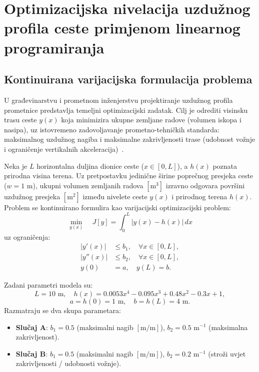 \section{Optimizacijska nivelacija uzdužnog profila ceste primjenom linearnog programiranja}

\subsection{Kontinuirana varijacijska formulacija problema}

U građevinarstvu i prometnom inženjerstvu projektiranje uzdužnog profila prometnice predstavlja temeljni optimizacijski zadatak. Cilj je odrediti visinsku trasu ceste $y(x)$ koja minimizira ukupne zemljane radove (volumen iskopa i nasipa), uz istovremeno zadovoljavanje prometno-tehničkih standarda: maksimalnog uzdužnog nagiba i maksimalne zakrivljenosti trase (udobnost vožnje i ograničenje vertikalnih akceleracija)~\cite{jokic2024predavanja}.

Neka je $L$ horizontalna duljina dionice ceste ($x \in [0, L]$), a $h(x)$ poznata prirodna visina terena. Uz pretpostavku jedinične širine poprečnog presjeka ceste ($w = 1\text{ m}$), ukupni volumen zemljanih radova $[\text{m}^3]$ izravno odgovara površini uzdužnog presjeka $[\text{m}^2]$ između nivelete ceste $y(x)$ i prirodnog terena $h(x)$. Problem se kontinuirano formulira kao varijacijski optimizacijski problem:
\begin{equation}
\min_{y(x)} \quad J[y] = \int_0^L |y(x) - h(x)| \, dx
\label{eq:road_continuous}
\end{equation}
uz ograničenja:
\begin{align}
|y'(x)| &\leq b_1, \quad \forall x \in [0, L], \label{eq:road_slope_cont} \\
|y''(x)| &\leq b_2, \quad \forall x \in [0, L], \label{eq:road_curv_cont} \\
y(0) &= a, \quad y(L) = b. \label{eq:road_bc_cont}
\end{align}

Zadani parametri modela su:
\begin{equation}
L = 10 \text{ m}, \quad h(x) = 0.0053 x^4 - 0.095 x^3 + 0.48 x^2 - 0.3 x + 1,
\end{equation}
\begin{equation}
a = h(0) = 1 \text{ m}, \quad b = h(L) = 4 \text{ m}.
\end{equation}
Razmatraju se dva skupa parametara:
\begin{itemize}
    \item \textbf{Slučaj A}: $b_1 = 0.5$ (maksimalni nagib $[\text{m/m}]$), $b_2 = 0.5 \text{ m}^{-1}$ (maksimalna zakrivljenost).
    \item \textbf{Slučaj B}: $b_1 = 0.5$ (maksimalni nagib $[\text{m/m}]$), $b_2 = 0.2 \text{ m}^{-1}$ (stroži uvjet zakrivljenosti / udobnosti vožnje).
\end{itemize}

